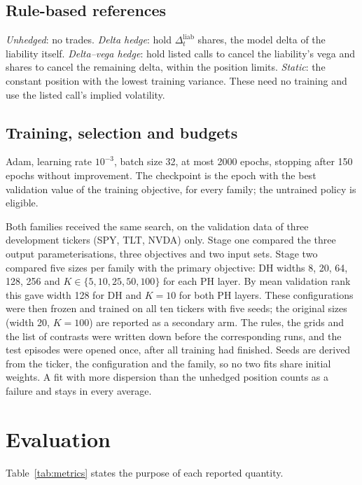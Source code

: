 \documentclass[10pt,conference]{IEEEtran}
\begin{document}
\subsection{Rule-based references}
\emph{Unhedged}: no trades. \emph{Delta hedge}: hold
$\Delta^{\mathrm{liab}}_t$ shares, the model delta of the liability itself.
\emph{Delta--vega hedge}: hold listed calls to cancel the liability's vega and
shares to cancel the remaining delta, within the position limits.
\emph{Static}: the constant position with the lowest training variance. These
need no training and use the listed call's implied volatility.

\subsection{Training, selection and budgets}
\label{sec:budget}
Adam, learning rate $10^{-3}$, batch size 32, at most 2000 epochs, stopping
after 150 epochs without improvement. The checkpoint is the epoch with the
best validation value of the training objective, for every family; the
untrained policy is eligible.

Both families received the same search, on the validation data of three
development tickers (SPY, TLT, NVDA) only. Stage one compared the three
output parameterisations, three objectives and two input sets. Stage two
compared five sizes per family with the primary objective: DH widths 8, 20,
64, 128, 256 and $K\in\{5,10,25,50,100\}$ for each PH layer. By mean
validation rank this gave width 128 for DH and $K=10$ for both PH layers.
These configurations were then frozen and trained on all ten tickers with
five seeds; the original sizes (width 20, $K=100$) are reported as a
secondary arm. The rules, the grids and the list of contrasts were written
down before the corresponding runs, and the test episodes were opened once,
after all training had finished. Seeds are derived from the ticker, the
configuration and the family, so no two fits share initial weights. A fit
with more dispersion than the unhedged position counts as a failure and
stays in every average.

\section{Evaluation}
\label{sec:eval}

Table~\ref{tab:metrics} states the purpose of each reported quantity.
\end{document}
